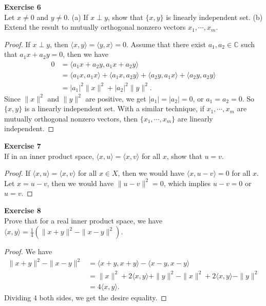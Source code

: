 \documentclass[12pt, a4paper]{article}
\theoremstyle{plain}
\newcommand{\C}{\mathbb{C}}
\newenvironment{exercise}[2][Exercise]
    { \begin{mdframed}[backgroundcolor=gray!20] \textbf{#1 #2} \\}
    {  \end{mdframed}}
\begin{document}
\begin{exercise}{6}
Let $x\neq 0$ and $y\neq 0$. (a) If $x\perp y$, show that $\{x,y\}$ is linearly independent set. (b) Extend the result to mutually orthogonal nonzero vectors $x_1,\cdots,x_m$.
\end{exercise}
	\begin{proof}
	If $x\perp y$, then $\langle{x,y}\rangle = \langle{y,x}\rangle = 0$. Assume that there exist $a_1,a_2\in \C$ such that $a_1x+a_2y=0$, then we have
	\begin{align*}
	0&=\langle{a_1x+a_2y,a_1x+a_2y}\rangle\\
	&= \langle{a_1x,a_1x}\rangle + \langle{a_1x,a_2y}\rangle + \langle{a_2y,a_1x}\rangle +\langle{a_2y,a_2y}\rangle\\
	&= |a_1|^2\|x\|^2 + |a_2|^2\|y\|^2.
	\end{align*}
	Since $\|x\|^2$ and $\|y\|^2$ are positive, we get $|a_1|=|a_2|=0$, or $a_1=a_2=0$. So $\{x,y\}$ is a linearly independent set. With a similar technique, if $x_1,\cdots,x_m$ are mutually orthogonal nonzero vectors, then $\{x_1,\cdots,x_m\}$ are linearly independent. 
	\end{proof}

\begin{exercise}{7}
If in an inner product space, $\langle{x,u}\rangle = \langle{x,v}\rangle$ for all $x$, show that $u=v$.
\end{exercise}
	\begin{proof}
	If $\langle{x,u}\rangle = \langle{x,v}\rangle$ for all $x\in X$, then we would have $\langle{x,u-v}\rangle = 0$ for all $x$. Let $x=u-v$, then we would have $\|u-v\|^2=0$, which implies $u-v=0$ or $u=v$.
	\end{proof}
	
\begin{exercise}{8}
Prove that for a real inner product space, we have $\langle{x,y}\rangle=\frac{1}{4}(\|x+y\|^2-\|x-y\|^2)$.
\end{exercise}
	\begin{proof}
	We have
	\begin{align*}
	\|x+y\|^2-\|x-y\|^2 &= \langle{x+y,x+y}\rangle - \langle{x-y,x-y}\rangle\\
	&= \|x\|^2 + 2\langle{x,y}\rangle +\|y\|^2 -\|x\|^2 +2\langle{x,y}\rangle -\|y\|^2\\
	&= 4\langle{x,y}\rangle.
	\end{align*}
	Dividing $4$ both sides, we get the desire equality.
	\end{proof}
\end{document}
